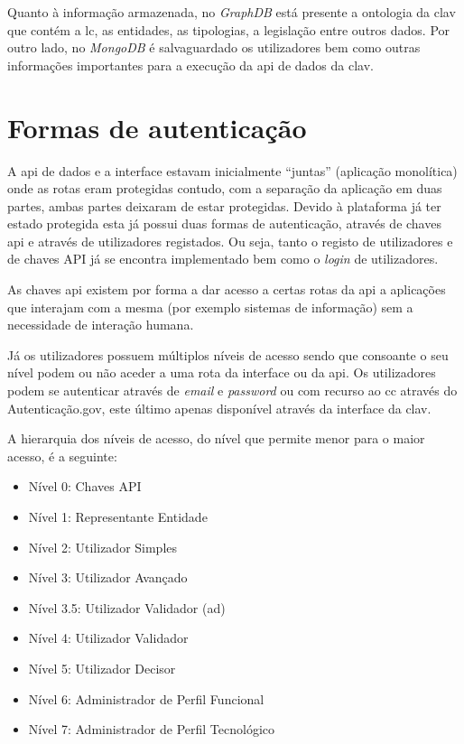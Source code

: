 Quanto à informação armazenada, no \textit{GraphDB} está presente a ontologia da \acrshort{clav} que contém a \acrshort{lc}, as entidades, as tipologias, a legislação entre outros dados. Por outro lado, no \textit{MongoDB} é salvaguardado os utilizadores bem como outras informações importantes para a execução da \acrshort{api} de dados da \acrshort{clav}.

\section{Formas de autenticação}\label{sec:autenticacao}
A \acrshort{api} de dados e a interface estavam inicialmente ``juntas'' (aplicação monolítica) onde as rotas eram protegidas contudo, com a separação da aplicação em duas partes, ambas partes deixaram de estar protegidas. Devido à plataforma já ter estado protegida esta já possui duas formas de autenticação, através de chaves \acrshort{api} e através de utilizadores registados. Ou seja, tanto o registo de utilizadores e de chaves API já se encontra implementado bem como o \textit{login} de utilizadores.

As chaves \acrshort{api} existem por forma a dar acesso a certas rotas da \acrshort{api} a aplicações que interajam com a mesma (por exemplo sistemas de informação) sem a necessidade de interação humana.

Já os utilizadores possuem múltiplos níveis de acesso sendo que consoante o seu nível podem ou não aceder a uma rota da interface ou da \acrshort{api}. Os utilizadores podem se autenticar através de \textit{email} e \textit{password} ou com recurso ao \acrfull{cc} através do Autenticação.gov, este último apenas disponível através da interface da \acrshort{clav}.

A hierarquia dos níveis de acesso, do nível que permite menor para o maior acesso, é a seguinte:
\begin{itemize}
    \item Nível 0: Chaves API
    \item Nível 1: Representante Entidade
    \item Nível 2: Utilizador Simples
    \item Nível 3: Utilizador Avançado
    \item Nível 3.5: Utilizador Validador (\acrshort{ad})
    \item Nível 4: Utilizador Validador
    \item Nível 5: Utilizador Decisor
    \item Nível 6: Administrador de Perfil Funcional
    \item Nível 7: Administrador de Perfil Tecnológico
\end{itemize}

